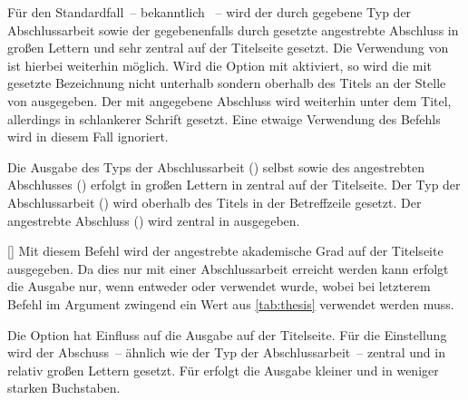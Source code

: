 \begin{Declaration*}{}
\begin{Declaration*}{}
\begin{Declaration*}{}
\begin{Declaration}{}
Für den Standardfall~-- bekanntlich ~-- wird der 
durch  gegebene Typ der Abschlussarbeit sowie der gegebenenfalls 
durch  gesetzte angestrebte Abschluss in großen Lettern und 
sehr zentral auf der Titelseite gesetzt. Die Verwendung von  ist 
hierbei weiterhin möglich.
%
Wird die Option mit  aktiviert, so wird die mit 
 gesetzte Bezeichnung nicht unterhalb sondern oberhalb des Titels 
an der Stelle von  ausgegeben. Der mit  
angegebene Abschluss wird weiterhin unter dem Titel, allerdings in schlankerer 
Schrift gesetzt. Eine etwaige Verwendung des Befehls  wird in 
diesem Fall ignoriert.
%
\begin{values}{}
\itemfalse
  Die Ausgabe des Typs der Abschlussarbeit () selbst sowie des 
  angestrebten Abschlusses () erfolgt in großen Lettern in 
  \DIN zentral auf der Titelseite.
\itemtrue*
  Der Typ der Abschlussarbeit () wird oberhalb des Titels in der 
  Betreffzeile gesetzt. Der angestrebte Abschluss () wird 
  zentral in \Univers ausgegeben.
\end{values}
\end{Declaration}

\begin{Declaration}[v2.02]{%
  []%
}
\printdeclarationlist%
%
Mit diesem Befehl wird der angestrebte akademische Grad auf der Titelseite 
ausgegeben. Da dies nur mit einer Abschlussarbeit erreicht werden kann erfolgt 
die Ausgabe nur, wenn entweder  oder  verwendet 
wurde, wobei bei letzterem Befehl im Argument zwingend ein Wert aus 
\autoref{tab:thesis} verwendet werden muss.

Die Option  hat Einfluss auf die Ausgabe auf der 
Titelseite. Für die Einstellung  wird der 
Abschuss~-- ähnlich wie 
der Typ der Abschlussarbeit~-- zentral und in relativ großen Lettern gesetzt. 
Für  erfolgt die Ausgabe kleiner und in weniger 
starken Buchstaben.
\end{Declaration}


\end{Declaration*}
\end{Declaration*}
\end{Declaration*}

